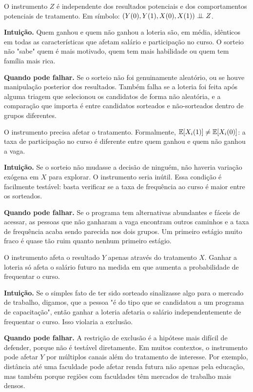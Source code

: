 \begin{hipotesebox}
O instrumento $Z$ é independente dos resultados potenciais e dos comportamentos potenciais de tratamento. Em símbolo: $(Y(0), Y(1), X(0), X(1)) \perp\!\!\!\perp Z$.

\textbf{Intuição.} Quem ganhou e quem não ganhou a loteria são, em média, idênticos em todas as características que afetam salário e participação no curso. O sorteio não "sabe" quem é mais motivado, quem tem mais habilidade ou quem tem família mais rica.

\textbf{Quando pode falhar.} Se o sorteio não foi genuinamente aleatório, ou se houve manipulação posterior dos resultados. Também falha se a loteria foi feita após alguma triagem que selecionou os candidatos de forma não aleatória, e a comparação que importa é entre candidatos sorteados e não-sorteados dentro de grupos diferentes.
\end{hipotesebox}

\begin{hipotesebox}
O instrumento precisa afetar o tratamento. Formalmente, $\mathbb{E}[X_i(1)] \neq \mathbb{E}[X_i(0)]$: a taxa de participação no curso é diferente entre quem ganhou e quem não ganhou a vaga.

\textbf{Intuição.} Se o sorteio não mudasse a decisão de ninguém, não haveria variação exógena em $X$ para explorar. O instrumento seria inútil. Essa condição é facilmente testável: basta verificar se a taxa de frequência ao curso é maior entre os sorteados.

\textbf{Quando pode falhar.} Se o programa tem alternativas abundantes e fáceis de acessar, as pessoas que não ganharam a vaga encontram outros caminhos e a taxa de frequência acaba sendo parecida nos dois grupos. Um primeiro estágio muito fraco é quase tão ruim quanto nenhum primeiro estágio.
\end{hipotesebox}

\begin{hipotesebox}
O instrumento afeta o resultado $Y$ apenas através do tratamento $X$. Ganhar a loteria só afeta o salário futuro na medida em que aumenta a probabilidade de frequentar o curso.

\textbf{Intuição.} Se o simples fato de ter sido sorteado sinalizasse algo para o mercado de trabalho, digamos, que a pessoa "é do tipo que se candidatou a um programa de capacitação", então ganhar a loteria afetaria o salário independentemente de frequentar o curso. Isso violaria a exclusão.

\textbf{Quando pode falhar.} A restrição de exclusão é a hipótese mais difícil de defender, porque não é testável diretamente. Em muitos contextos, o instrumento pode afetar $Y$ por múltiplos canais além do tratamento de interesse. Por exemplo, distância até uma faculdade pode afetar renda futura não apenas pela educação, mas também porque regiões com faculdades têm mercados de trabalho mais densos.
\end{hipotesebox}

